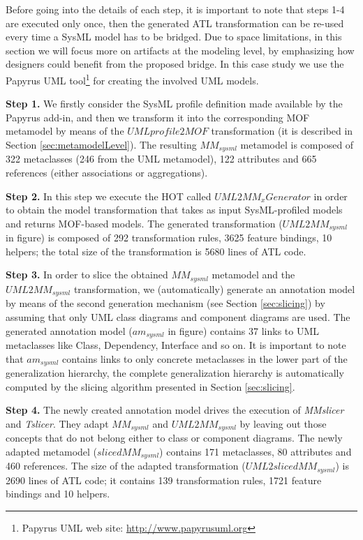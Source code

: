 %
Before going into the details of each step, it is important to note that steps 1-4 are executed only once, 
then the generated ATL transformation can be re-used every time a SysML model has to be bridged.
Due to space limitations, in this section we will focus more on artifacts at the modeling level, by emphasizing
how designers could benefit from the proposed bridge.
In this case study we use the Papyrus UML tool\footnote{Papyrus UML web site: \small{\url{http://www.papyrusuml.org}}} for
creating the involved UML models. 

\textbf{Step 1.} We firstly consider the SysML profile definition made available by the Papyrus add-in,
and then we transform it into the corresponding MOF metamodel
by means of the $UMLprofile2MOF$ transformation (it is described in Section \ref{sec:metamodelLevel}). 
The resulting $MM_{sysml}$ metamodel is composed of 322 metaclasses (246 from the UML metamodel), 
122 attributes and 665 references (either associations or aggregations).

\textbf{Step 2.} In this step we execute the HOT called $UML2MM_xGenerator$ in order to obtain the
model transformation that takes as input SysML-profiled models and returns MOF-based models. The generated transformation 
($UML2MM_{sysml}$ in figure) is composed of 292 transformation rules, 3625 feature bindings, 10 helpers; the total size of the transformation is 5680 lines of ATL code.

\textbf{Step 3.} In order to slice the obtained $MM_{sysml}$ metamodel and the $UML2MM_{sysml}$ transformation, 
we (automatically) generate an annotation model by means of the second generation mechanism
(see Section \ref{sec:slicing}) by assuming that only UML class diagrams and component diagrams are used.
The generated annotation model ($am_{sysml}$ in figure) contains 37 links to UML metaclasses like Class, Dependency, Interface and so on.
It is important to note that $am_{sysml}$ contains links to only concrete metaclasses in the lower part of the generalization hierarchy, the complete generalization hierarchy is automatically computed by the slicing algorithm presented in Section \ref{sec:slicing}.

\textbf{Step 4.} The newly created annotation model drives the execution of \textit{MMslicer} and \textit{Tslicer}.
They adapt $MM_{sysml}$ and $UML2MM_{sysml}$ by leaving out those concepts that do not
belong either to class or component diagrams. 
The newly adapted metamodel ($slicedMM_{sysml}$) contains 171 metaclasses, 80 attributes and 460 references. 
The size of the adapted transformation ($UML2slicedMM_{sysml}$) is 2690 lines 
of ATL code; it contains 139 transformation rules, 1721 feature bindings and 10 helpers. 

